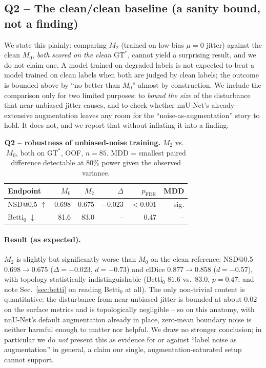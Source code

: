 \documentclass[
    bookmarks, bookmarksnumbered, bookmarksopen,
    colorlinks=true, citecolor=blue, linkcolor=blue, urlcolor=blue
]{techrep}
\newcommand{\gtstar}{\ensuremath{\mathrm{GT}^{\!*}}}
\newcommand{\pending}{{\color{red}\small$\langle$pending$\rangle$}}
\newcommand{\QtwoNsdMzero}{\pending}\newcommand{\QtwoNsdMtwo}{\pending}
\newcommand{\QtwoNsdDelta}{\pending}\newcommand{\QtwoNsdP}{\pending}\newcommand{\QtwoNsdMDD}{\pending}
\newcommand{\QtwoBettiMzero}{\pending}\newcommand{\QtwoBettiMtwo}{\pending}\newcommand{\QtwoBettiP}{\pending}
\newcommand{\Ncases}{85}   %
\renewcommand{\QtwoNsdMzero}{0.698}\renewcommand{\QtwoNsdMtwo}{0.675}
\renewcommand{\QtwoNsdDelta}{$-0.023$}\renewcommand{\QtwoNsdP}{$<$0.001}\renewcommand{\QtwoNsdMDD}{sig.}
\renewcommand{\QtwoBettiMzero}{81.6}\renewcommand{\QtwoBettiMtwo}{83.0}\renewcommand{\QtwoBettiP}{0.47}
\begin{document}
\subsection{Q2 -- The clean/clean baseline (a sanity bound, not a finding)}\label{sec:q2}
We state this plainly: comparing $M_2$ (trained on low-bias $\mu{=}0$ jitter) against the clean
$M_0$, \emph{both scored on the clean $\gtstar$}, cannot yield a surprising result, and we do not
claim one. A model trained on degraded labels is not expected to beat a model trained on clean
labels when both are judged by clean labels; the outcome is bounded above by ``no better than
$M_0$'' almost by construction. We include the comparison only for two limited purposes: to
\emph{bound the size} of the disturbance that near-unbiased jitter causes, and to check whether
nnU-Net's already-extensive augmentation leaves any room for the ``noise-as-augmentation'' story
to hold. It does not, and we report that without inflating it into a finding.

\begin{table}[t]
  \centering
  \caption{\textbf{Q2 -- robustness of unbiased-noise training.} $M_2$ vs.\ $M_0$, both on
  $\gtstar$, OOF, $n{=}\Ncases$. MDD = smallest paired difference detectable at $80\%$
  power given the observed variance.
  }
  \label{tab:q2}
  \small
  \begin{tabular}{lrrrrr}
    \toprule
    Endpoint & $M_0$ & $M_2$ & $\Delta$ & $p_{\text{FDR}}$ & MDD \\
    \midrule
    NSD@0.5 $\uparrow$ & \QtwoNsdMzero & \QtwoNsdMtwo & \QtwoNsdDelta & \QtwoNsdP & \QtwoNsdMDD \\
    Betti$_0$ $\downarrow$ & \QtwoBettiMzero & \QtwoBettiMtwo & -- & \QtwoBettiP & -- \\
    \bottomrule
  \end{tabular}
\end{table}

\paragraph{Result (as expected).} $M_2$ is slightly but significantly worse than $M_0$ on the
clean reference: NSD@0.5 $0.698\!\to\!0.675$ ($\Delta{=}{-}0.023$, $d{=}{-}0.73$) and clDice
$0.877\!\to\!0.858$ ($d{=}{-}0.57$), with topology statistically indistinguishable (Betti$_0$
$81.6$ vs.\ $83.0$, $p{=}0.47$; and note Sec.~\ref{sec:betti} on reading Betti$_0$ at all). The
only non-trivial content is quantitative: the disturbance from near-unbiased jitter is bounded at
about $0.02$ on the surface metrics and is topologically negligible -- so on this anatomy, with
nnU-Net's default augmentation already in place, zero-mean boundary noise is neither harmful
enough to matter nor helpful. We draw no stronger conclusion; in particular we do \emph{not}
present this as evidence for or against ``label noise as augmentation'' in general, a claim our
single, augmentation-saturated setup cannot support.
\end{document}
